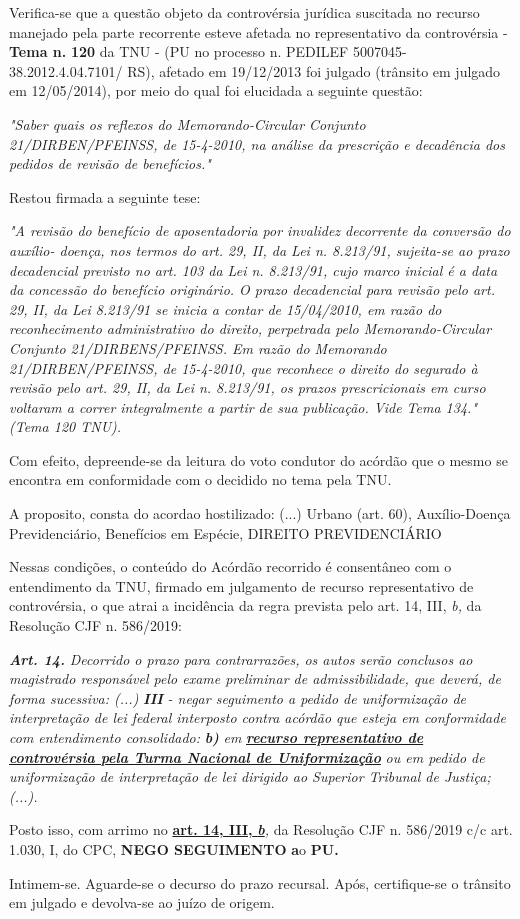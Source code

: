 \documentclass[12pt]{article}
\begin{document}
\justifying
\noindent Verifica-se que a questão objeto da controvérsia jurídica suscitada no recurso manejado pela parte recorrente esteve afetada no representativo da controvérsia - \textbf{Tema n. }\textbf{120} da TNU - (PU no processo n. PEDILEF 5007045-38.2012.4.04.7101/ RS),  afetado em 19/12/2013 foi julgado (trânsito em julgado em 12/05/2014), por meio do qual foi elucidada a seguinte questão:

\noindent \textit{"Saber quais os reflexos do Memorando-Circular Conjunto 21/DIRBEN/PFEINSS, de 15-4-2010, na análise da prescrição e decadência dos pedidos de revisão de benefícios."}

\noindent Restou firmada a seguinte tese:

\noindent \textit{"A revisão do benefício de aposentadoria por invalidez decorrente da conversão do auxílio- doença, nos termos do art. 29, II, da Lei n. 8.213/91, sujeita-se ao prazo decadencial previsto no art. 103 da Lei n. 8.213/91, cujo marco inicial é a data da concessão do benefício originário. O prazo decadencial para revisão pelo art. 29, II, da Lei 8.213/91 se inicia a contar de 15/04/2010, em razão do reconhecimento administrativo do direito, perpetrada pelo Memorando-Circular Conjunto 21/DIRBENS/PFEINSS. Em razão do Memorando 21/DIRBEN/PFEINSS, de 15-4-2010, que reconhece o direito do segurado à revisão pelo art. 29, II, da Lei n. 8.213/91, os prazos prescricionais em curso voltaram a correr integralmente a partir de sua publicação. Vide Tema 134." (Tema 120 TNU).}

\noindent Com efeito, depreende-se da leitura do voto condutor do acórdão que o mesmo se encontra em conformidade com o decidido no  tema pela TNU.

\noindent A proposito, consta do acordao hostilizado: (...) Urbano (art. 60), Auxílio-Doença Previdenciário, Benefícios em Espécie, DIREITO PREVIDENCIÁRIO

\noindent Nessas condições, o conteúdo do Acórdão recorrido é consentâneo com o entendimento da TNU, firmado em julgamento de recurso representativo de controvérsia, o que atrai a incidência da regra prevista pelo art. 14, III, \textit{b,} da Resolução CJF n. 586/2019:

\noindent \textit{\textbf{Art. 14.}}\textit{ Decorrido o prazo para contrarrazões, os autos serão conclusos ao magistrado responsável pelo exame preliminar de admissibilidade, que deverá, de forma sucessiva: (...) }\textit{\textbf{III }}\textit{- negar seguimento a pedido de uniformização de interpretação de lei federal interposto contra acórdão que esteja em conformidade com entendimento consolidado: }\textit{\textbf{b)}}\textit{ em }\uline{\textit{\textbf{recurso representativo de controvérsia pela Turma Nacional de Uniformização}}}\textit{ ou em pedido de uniformização de interpretação de lei dirigido ao Superior Tribunal de Justiça;(...).}

\noindent Posto isso, com arrimo no \uline{\textbf{art. 14, III, }}\uline{\textit{\textbf{b}}}\textit{,} da Resolução CJF n. 586/2019 c/c art. 1.030, I, do CPC, \textbf{NEGO SEGUIMENTO }\textbf{a}o\textbf{ PU}\textbf{.}

\noindent Intimem-se. Aguarde-se o decurso do prazo recursal. Após, certifique-se o trânsito em julgado e devolva-se ao juízo de origem.
\end{document}
